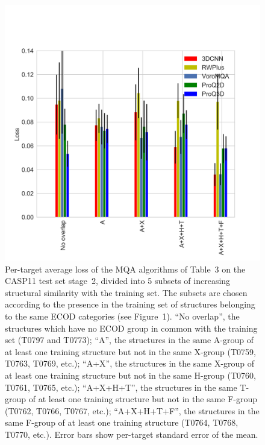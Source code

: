 \documentclass[letter,10pt]{article}
\begin{document}
\begin{figure}[H]
    \centering
    \includegraphics[width=\linewidth]{Fig/LossVsECOD.png}
%
    \caption{Per-target average loss of the MQA algorithms of Table~3
    on the CASP11 test set stage~2, divided into 5 subsets of
    increasing structural similarity with the training set. The
    subsets are chosen according to the presence in the training set
    of structures belonging to the same ECOD categories (see Figure~1). 
%
    ``No overlap'', the structures which have no ECOD group in common
    with the training set (T0797 and T0773);
%
    ``A'', the structures in the same A-group of at least one training
    structure but not in the same X-group (T0759, T0763, T0769, etc.); 
%
    ``A+X'', the structures in the same X-group of at least one training
    structure but not in the same H-group (T0760, T0761, T0765, etc.);
%
    ``A+X+H+T'', the structures in the same T-group of at least one
    training structure but not in the same F-group (T0762, T0766, T0767,
    etc.);
%
    ``A+X+H+T+F'', the structures in the same F-group of at least one
    training structure (T0764, T0768, T0770, etc.).
%
    Error bars show per-target standard error of the mean.}
%
    \label{Fig:LossVsECOD}
\end{figure}
\end{document}
